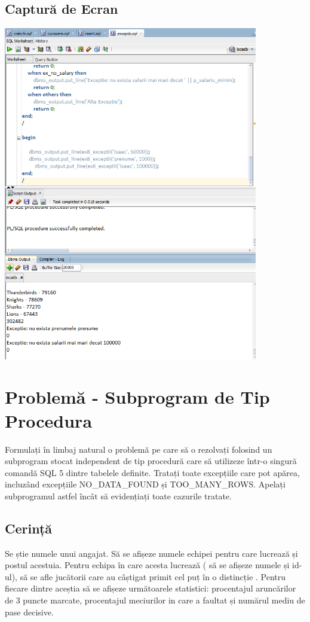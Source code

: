 \documentclass{article}
\begin{document}
\subsection{Captură de Ecran}
\includegraphics[width=30em, keepaspectratio]{rez_exceptii8}
\pagebreak

\section{Problemă - Subprogram de Tip Procedura}
	Formulați în limbaj natural o problemă pe care să o rezolvați folosind un subprogram stocat
	independent de tip procedură care să utilizeze într-o singură comandă SQL 5 dintre tabelele
	definite. Tratați toate excepțiile care pot apărea, incluzând excepțiile NO\_DATA\_FOUND și
	TOO\_MANY\_ROWS. Apelați subprogramul astfel încât să evidențiați toate cazurile tratate.

\subsection{Cerință}
Se știe numele unui angajat. Să se afișeze numele echipei pentru care lucrează și postul acestuia. Pentru echipa în care acesta lucrează ( să se afișeze numele și id-ul), să se afle jucătorii care au câștigat primit cel puț în o distincție . Pentru fiecare dintre aceștia să se afișeze următoarele statistici: procentajul aruncărilor de 3 puncte marcate, procentajul meciurilor in care a faultat și numărul mediu de pase decisive.
\end{document}
